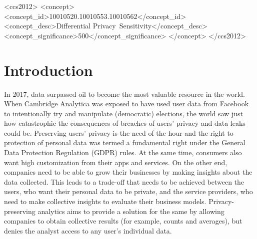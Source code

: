 \documentclass[acmsmall]{acmart}
\begin{document}

\begin{CCSXML}
<ccs2012>
 <concept>
  <concept_id>10010520.10010553.10010562</concept_id>
  <concept_desc>Differential Privacy~Sensitivity</concept_desc>
  <concept_significance>500</concept_significance>
 </concept>
</ccs2012>
\end{CCSXML}




\maketitle

\section{Introduction}\label{1}
In 2017, data surpassed oil to become the most valuable resource in the world. When Cambridge Analytica was exposed to have used user data from Facebook to intentionally try and manipulate (democratic) elections, the world saw just how catastrophic the consequences of breaches of users’ privacy and data leaks could be. Preserving users' privacy is the need of the hour and the right to protection of personal data was termed a fundamental right under the General Data Protection Regulation (GDPR) rules. 
\newline
At the same time, consumers also want high customization from their apps and services. On the other end, companies need to be able to grow their businesses by making insights about the data collected. This leads to a trade-off that needs to be achieved between the users, who want their personal data to be private, and the service providers, who need to make collective insights to evaluate their business models. Privacy-preserving analytics aims to provide a solution for the same by allowing companies to obtain collective results (for example, counts and averages), but denies the analyst access to any user’s individual data.
\end{document}
